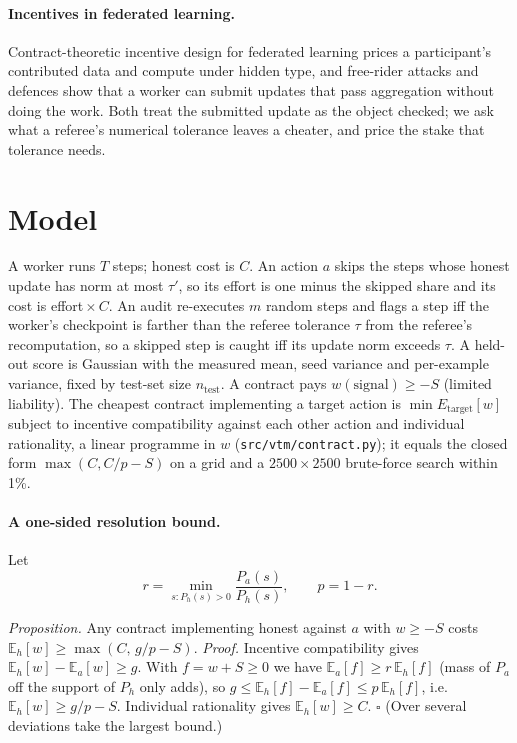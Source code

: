 \documentclass[sigconf,anonymous]{acmart}
\begin{document}
\paragraph{Incentives in federated learning.}
Contract-theoretic incentive design for federated learning \cite{kang2019contract} prices a participant's contributed data and
compute under hidden type, and free-rider attacks and defences \cite{lin2019freeriders} show that a worker can submit updates
that pass aggregation without doing the work. Both treat the submitted update as the object checked; we ask what a referee's
numerical tolerance leaves a cheater, and price the stake that tolerance needs.
\section{Model}\label{sec:model}
A worker runs $T$ steps; honest cost is $C$. An action $a$ skips the steps whose honest update has norm at most
$\tau'$, so its effort is one minus the skipped share and its cost is effort${}\times C$. An audit re-executes $m$
random steps and flags a step iff the worker's checkpoint is farther than the referee tolerance $\tau$ from the
referee's recomputation, so a skipped step is caught iff its update norm exceeds $\tau$. A held-out score is Gaussian
with the measured mean, seed variance and per-example variance, fixed by test-set size $n_{\text{test}}$. A contract
pays $w(\text{signal})\ge -S$ (limited liability). The cheapest contract implementing a target action is
$\min E_{\text{target}}[w]$ subject to incentive compatibility against each other action and individual rationality,
a linear programme in $w$ (\texttt{src/vtm/contract.py}); it equals the closed form $\max(C,C/p-S)$ on a grid and a
$2500\times2500$ brute-force search within 1\%.
\paragraph{A one-sided resolution bound.}
Let
\[ r=\min_{s:P_h(s)>0}\frac{P_a(s)}{P_h(s)},\qquad p=1-r. \]

\emph{Proposition.} Any contract implementing honest against $a$ with $w\ge -S$ costs $\mathbb{E}_h[w]\ge\max(C,\,g/p-S)$.
\emph{Proof.} Incentive compatibility gives $\mathbb{E}_h[w]-\mathbb{E}_a[w]\ge g$. With $f=w+S\ge0$ we have $\mathbb{E}_a[f]\ge r\,\mathbb{E}_h[f]$
(mass of $P_a$ off the support of $P_h$ only adds), so $g\le\mathbb{E}_h[f]-\mathbb{E}_a[f]\le p\,\mathbb{E}_h[f]$, i.e.\ $\mathbb{E}_h[w]\ge g/p-S$.
Individual rationality gives $\mathbb{E}_h[w]\ge C$. $\square$ (Over several deviations take the largest bound.)
\end{document}
